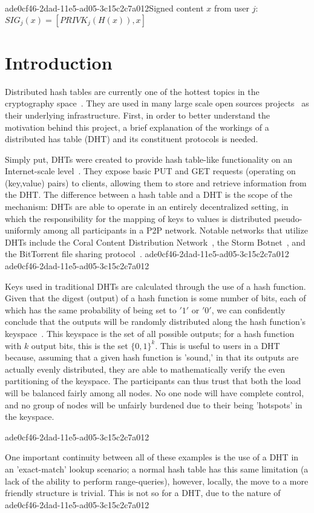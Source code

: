\documentclass[12pt]{article}
\begin{document}
ade0cf46-2dad-11e5-ad05-3c15c2c7a012Signed content $x$ from user $j$: $SIG_j(x) = \left[ PRIVK_j( H(x) ), x \right]$

\section{Introduction}
\par Distributed hash tables are currently one of the hottest topics in the cryptography space~\cite{Stoica:2001dj,Rowstron:2001ea,Ratnasamy:2001wn}. They are used in many large scale open sources projects~\cite{Freitas:2013tb,Xu:2010vs,Perfitt:2010fh} as their underlying infrastructure. First, in order to better understand the motivation behind this project, a brief explanation of the workings of a distributed has table (DHT) and its constituent protocols is needed.

\par Simply put, DHTs were created to provide hash table-like functionality on an Internet-scale level~\cite{Ratnasamy:2001wn}. They expose basic PUT and GET requests (operating on (key,value) pairs) to clients, allowing them to store and retrieve information from the DHT. The difference between a hash table and a DHT is the scope of the mechanism: DHTs are able to operate in an entirely decentralized setting, in which the responsibility for the mapping of keys to values is distributed pseudo-uniformly among all participants in a P2P network. Notable networks that utilize DHTs include the Coral Content Distribution Network~\cite{Freedman:2004vb}, the Storm Botnet~\cite{Holz:2008uk}, and the BitTorrent file sharing protocol~\cite{Cohen:y1_8mBnw}.
ade0cf46-2dad-11e5-ad05-3c15c2c7a012
ade0cf46-2dad-11e5-ad05-3c15c2c7a012\par Keys used in traditional DHTs are calculated through the use of a hash function. Given that the digest (output) of a hash function is some number of bits, each of which has the same probability of being set to $'1'$ or $'0'$, we can confidently conclude that the outputs will be randomly distributed along the hash function's keyspace~. This keyspace is the set of all possible outputs; for a hash function with $k$ output bits, this is the set $\{0,1\}^k$. This is useful to users in a DHT because, assuming that a given hash function is 'sound,' in that its outputs are actually evenly distributed, they are able to mathematically verify the even partitioning of the keyspace. The participants can thus trust that both the load will be balanced fairly among all nodes. No one node will have complete control, and no group of nodes will be unfairly burdened due to their being 'hotspots' in the keyspace.~

ade0cf46-2dad-11e5-ad05-3c15c2c7a012\par One important continuity between all of these examples is the use of a DHT in an 'exact-match' lookup scenario; a normal hash table has this same limitation (a lack of the ability to perform range-queries), however, locally, the move to a more friendly structure is trivial. This is not so for a DHT, due to the nature of
ade0cf46-2dad-11e5-ad05-3c15c2c7a012\printbibliography
\end{document}
